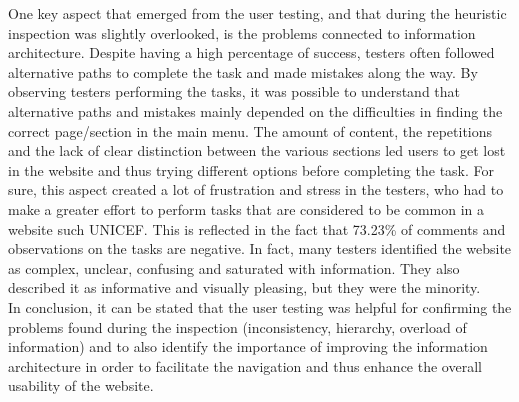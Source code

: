 One key aspect that emerged from the user testing, and that during the heuristic inspection was slightly overlooked, is the problems connected to information architecture. Despite having a high percentage of success, testers often followed alternative paths to complete the task and made mistakes along the way. By observing testers performing the tasks, it was possible to understand that alternative paths and mistakes mainly depended on the difficulties in finding the correct page/section in the main menu. The amount of content, the repetitions and the lack of clear distinction between the various sections led users to get lost in the website and thus trying different options before completing the task. For sure, this aspect created a lot of frustration and stress in the testers, who had to make a greater effort to perform tasks that are considered to be common in a website such UNICEF. This is reflected in the fact that 73.23\% of comments and observations on the tasks are negative. In fact, many testers identified the website as complex, unclear, confusing and saturated with information. They also described it as informative and visually pleasing, but they were the minority.\\

In conclusion, it can be stated that the user testing was helpful for confirming the problems found during the inspection (inconsistency, hierarchy, overload of information) and to also identify the importance of improving the information architecture in order to facilitate the navigation and thus enhance the overall usability of the website.
